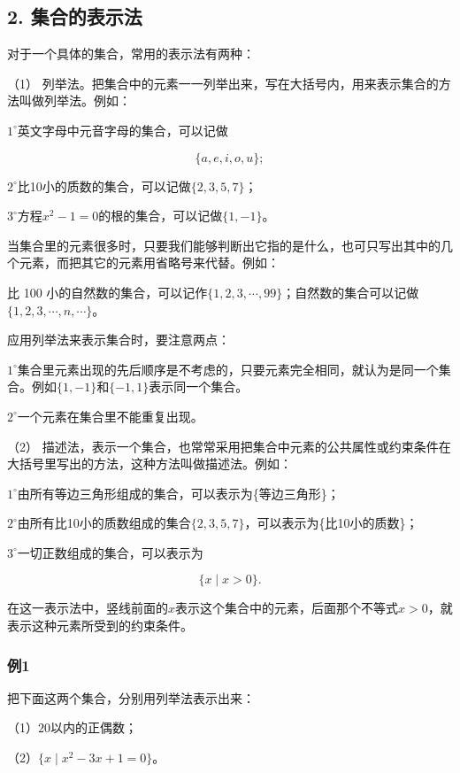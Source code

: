 \subsection{2. 集合的表示法}

对于一个具体的集合，常用的表示法有两种：

（1）
列举法。把集合中的元素一一列举出来，写在大括号内，用来表示集合的方法叫做列举法。例如：

\(1^{\circ}\)英文字母中元音字母的集合，可以记做

\[
\{a, e, i, o, u \};
\]

\(2^{\circ}\)比10小的质数的集合，可以记做\(\{2, 3, 5, 7\}\)；

\(3^{\circ}\)方程\(x^{2} - 1 = 0\)的根的集合，可以记做\(\{1, -1\}\)。

当集合里的元素很多时，只要我们能够判断出它指的是什么，也可只写出其中的几个元素，而把其它的元素用省略号来代替。例如：

比 100
小的自然数的集合，可以记作\(\{1, 2, 3, \cdots, 99\}\)；自然数的集合可以记做\(\{1, 2, 3, \cdots, n, \cdots\}\)。

应用列举法来表示集合时，要注意两点：

\(1^{\circ}\)集合里元素出现的先后顺序是不考虑的，只要元素完全相同，就认为是同一个集合。例如\(\{1, -1\}\)和\(\{-1, 1\}\)表示同一个集合。

\(2^{\circ}\)一个元素在集合里不能重复出现。

（2）
描述法，表示一个集合，也常常采用把集合中元素的公共属性或约束条件在大括号里写出的方法，这种方法叫做描述法。例如：

\(1^{\circ}\)由所有等边三角形组成的集合，可以表示为\{等边三角形\}；

\(2^{\circ}\)由所有比10小的质数组成的集合\(\{2, 3, 5, 7\}\)，可以表示为\{比10小的质数\}；

\(3^{\circ}\)一切正数组成的集合，可以表示为

\[
\{x \mid x > 0 \}. \tag {①}
\]

在这一表示法中，竖线前面的\(x\)表示这个集合中的元素，后面那个不等式\(x > 0\)，就表示这种元素所受到的约束条件。

\subsubsection{例1}

把下面这两个集合，分别用列举法表示出来：

（1）\(20\)以内的正偶数；

（2）\(\{x \mid x^2 - 3x + 1 = 0\}\)。

